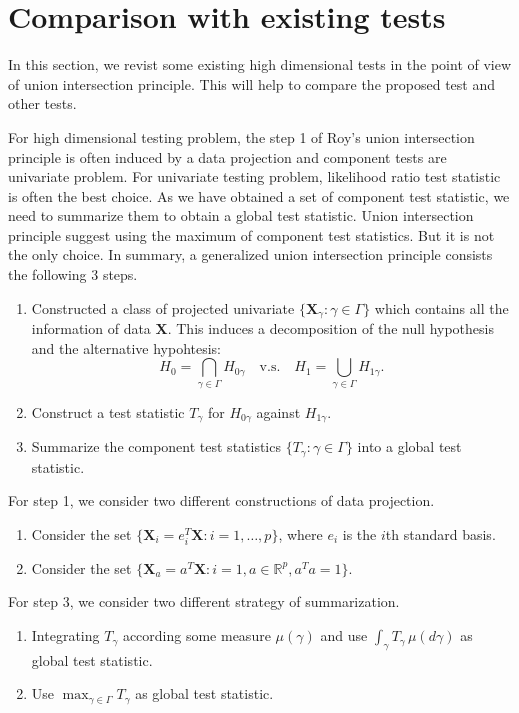 \documentclass[12pt]{article} %
\newcommand{\bX}{\mathbf{X}}
\theoremstyle{definition}
\begin{document}
\section{Comparison with existing tests}
\label{sc:compare}
In this section, we revist some existing high dimensional tests in the point of view of union intersection principle.
This will help to compare the proposed test and other tests.

For high dimensional testing problem, the step 1 of Roy's union intersection principle is often induced by a data projection and component tests are univariate problem.
For univariate testing problem, likelihood ratio test statistic is often the best choice.
As we have obtained a set of component test statistic, we need to summarize them to obtain a global test statistic.
Union intersection principle suggest using the maximum of component test statistics.
But it is not the only choice.
In summary, a generalized union intersection principle consists the following 3 steps.
\begin{enumerate}
    \item
       Constructed a class of projected univariate $\{\bX_{\gamma}:\gamma\in\Gamma\}$ which contains all the information of data $\bX$.
        This induces a decomposition of the null hypothesis and the alternative hypohtesis:
        $$
        H_0=\bigcap_{\gamma\in\Gamma} H_{0\gamma} \quad \text{v.s.} \quad 
        H_1=\bigcup_{\gamma\in \Gamma} H_{1\gamma}.
        $$
    \item
        Construct a test statistic $T_\gamma$ for $H_{0\gamma}$ against $H_{1\gamma}$.
    \item
        Summarize the component test statistics $\{T_{\gamma}:\gamma\in\Gamma\}$ into a global test statistic.
\end{enumerate}
For step 1, we consider two different constructions of data projection.
\begin{enumerate}[i]
    \item
        Consider the set $\{\bX_{i}=e_i^T \bX:i=1,\ldots,p\}$, where $e_i$ is the $i$th standard basis.
\item
    Consider the set $\{\bX_{a}=a^T \bX:i=1,a\in\mathbb{R}^p, a^T a=1\}$.
\end{enumerate}
For step 3, we consider two different strategy of summarization.
\begin{enumerate}[I]
    \item
        Integrating $T_\gamma$ according some measure $\mu(\gamma)$ and use $\int_\gamma T_{\gamma}\,\mu(d\gamma)$ as global test statistic.
\item
    Use $\max_{\gamma\in\Gamma}T_\gamma$ as global test statistic.
\end{enumerate}
\end{document}
